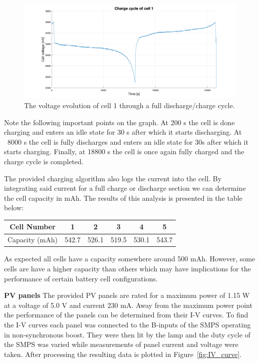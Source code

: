 \documentclass[a4paper]{article}
\begin{document}
\begin{figure}[H]
    \centering
    \includegraphics[scale=0.18]{charge_cycle.png}
    \caption{The voltage evolution of cell 1 through a full discharge/charge cycle.}
    \label{fig:charge_cycle}
\end{figure}

Note the following important points on the graph. At 200 s the cell is done charging and
enters an idle state for 30 s after which it starts discharging. At ~8000 s the cell is fully
discharges and enters an idle state for 30s after which it starts charging. Finally, at 18800 s the cell is once 
again fully charged and the charge cycle is completed.

The provided charging algorithm also logs the current into the cell.
By integrating said current for a full charge or discharge section
we can determine the cell capacity in mAh. The results of this analysis is 
presented in the table below:

\begin{center}
    \begin{tabular}{||c| c c c c c||} 
    \hline
    Cell Number& 1 & 2 & 3 & 4 & 5 \\ [0.5ex] 
    \hline
    Capacity (mAh) & 542.7	& 526.1	& 519.5	& 530.1	& 543.7\\ [1ex] 
    \hline
    \end{tabular}
    \end{center}


As expected all cells have a capacity somewhere around 500 mAh. However, some cells
are have a higher capacity than others which may have implications for the performance
of certain battery cell configurations.


\textbf{PV panels}
\vspace{10pt} 
\newline
The provided PV panels are rated for a maximum power of 1.15 W at a voltage 
of 5.0 V and current 230 mA. Away from the maximum power point the performance of 
the panels can be determined from their I-V curves. To find the I-V curves each 
panel was connected to the B-inputs of the SMPS operating in non-synchronous boost.
They were then lit by the lamp and the duty cycle of the SMPS was varied while measurements 
of panel current and voltage were taken. After processing the resulting data
is plotted in Figure~\ref{fig:IV_curve}.
\end{document}
